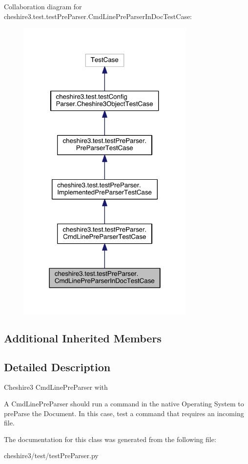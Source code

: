Collaboration diagram for cheshire3.\-test.\-test\-Pre\-Parser.\-Cmd\-Line\-Pre\-Parser\-In\-Doc\-Test\-Case\-:
\nopagebreak
\begin{figure}[H]
\begin{center}
\leavevmode
\includegraphics[width=250pt]{classcheshire3_1_1test_1_1test_pre_parser_1_1_cmd_line_pre_parser_in_doc_test_case__coll__graph}
\end{center}
\end{figure}
\subsection*{Additional Inherited Members}


\subsection{Detailed Description}
\begin{DoxyVerb}Cheshire3 CmdLinePreParser with %

A CmdLinePreParser should run a command in the native Operating System to
preParse the Document. In this case, test a command that requires an 
incoming file.
\end{DoxyVerb}
 

The documentation for this class was generated from the following file\-:\begin{DoxyCompactItemize}
\item 
cheshire3/test/test\-Pre\-Parser.\-py\end{DoxyCompactItemize}
